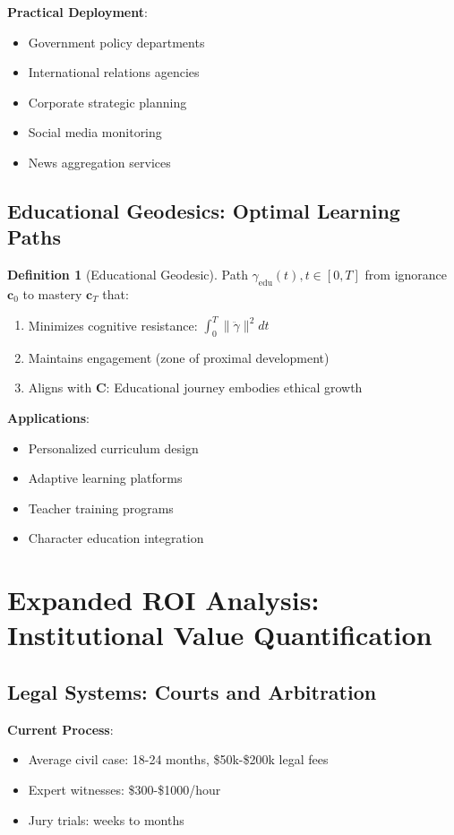 \documentclass[11pt,a4paper]{article}
\theoremstyle{definition}
\newtheorem{definition}{Definition}[section]
\theoremstyle{remark}
\newcommand{\cc}{\mathbf{c}}
\begin{document}
\textbf{Practical Deployment}:
\begin{itemize}
\item Government policy departments
\item International relations agencies
\item Corporate strategic planning
\item Social media monitoring
\item News aggregation services
\end{itemize}

\subsection{Educational Geodesics: Optimal Learning Paths}

\begin{definition}[Educational Geodesic]
Path \(\gamma_{\text{edu}}(t), t \in [0, T]\) from ignorance \(\cc_0\) to mastery \(\cc_T\) that:
\begin{enumerate}
\item Minimizes cognitive resistance: \(\int_0^T \|\ddot{\gamma}\|^2 dt\)
\item Maintains engagement (zone of proximal development)
\item Aligns with \(\mathbf{C}\): Educational journey embodies ethical growth
\end{enumerate}
\end{definition}

\textbf{Applications}:
\begin{itemize}
\item Personalized curriculum design
\item Adaptive learning platforms
\item Teacher training programs
\item Character education integration
\end{itemize}

\section{Expanded ROI Analysis: Institutional Value Quantification}

\subsection{Legal Systems: Courts and Arbitration}

\textbf{Current Process}:
\begin{itemize}
\item Average civil case: 18-24 months, \$50k-\$200k legal fees
\item Expert witnesses: \$300-\$1000/hour
\item Jury trials: weeks to months
\end{itemize}
\end{document}
